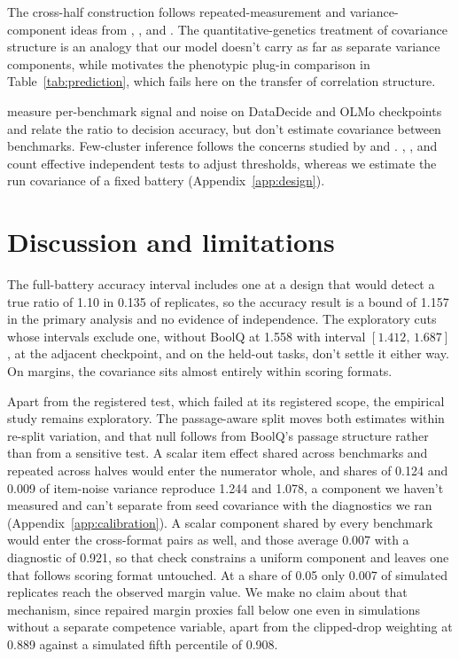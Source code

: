 \documentclass{article}
\newcommand{\ci}[2]{\ensuremath{[#1,\,#2]}}
\begin{document}
The cross-half construction follows repeated-measurement and variance-component ideas from \citet{spearman1904}, \citet{cronbach1951}, and \citet{searle1992}. The quantitative-genetics treatment of covariance structure \citep{martin1977} is an analogy that our model doesn't carry as far as separate variance components, while \citet{cheverud1988} motivates the phenotypic plug-in comparison in Table~\ref{tab:prediction}, which fails here on the transfer of correlation structure.

\citet{heineman2025} measure per-benchmark signal and noise on DataDecide and OLMo checkpoints and relate the ratio to decision accuracy, but don't estimate covariance between benchmarks. Few-cluster inference follows the concerns studied by \citet{cameron2008} and \citet{mackinnon2017}. \citet{cheverud2001}, \citet{nyholt2004}, and \citet{li2005} count effective independent tests to adjust thresholds, whereas we estimate the run covariance of a fixed battery (Appendix~\ref{app:design}).

\section{Discussion and limitations}
The full-battery accuracy interval includes one at a design that would detect a true ratio of 1.10 in 0.135 of replicates, so the accuracy result is a bound of 1.157 in the primary analysis and no evidence of independence. The exploratory cuts whose intervals exclude one, without BoolQ at 1.558 with interval \ci{1.412}{1.687}, at the adjacent checkpoint, and on the held-out tasks, don't settle it either way. On margins, the covariance sits almost entirely within scoring formats.

Apart from the registered test, which failed at its registered scope, the empirical study remains exploratory. The passage-aware split moves both estimates within re-split variation, and that null follows from BoolQ's passage structure rather than from a sensitive test. A scalar item effect shared across benchmarks and repeated across halves would enter the numerator whole, and shares of 0.124 and 0.009 of item-noise variance reproduce 1.244 and 1.078, a component we haven't measured and can't separate from seed covariance with the diagnostics we ran (Appendix~\ref{app:calibration}). A scalar component shared by every benchmark would enter the cross-format pairs as well, and those average 0.007 with a diagnostic of 0.921, so that check constrains a uniform component and leaves one that follows scoring format untouched. At a share of 0.05 only 0.007 of simulated replicates reach the observed margin value. We make no claim about that mechanism, since repaired margin proxies fall below one even in simulations without a separate competence variable, apart from the clipped-drop weighting at 0.889 against a simulated fifth percentile of 0.908.
\end{document}
